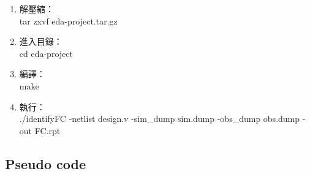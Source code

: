 \documentclass[12pt,a4paper]{article}
\begin{document}
\begin{enumerate}
\item 解壓縮：\\tar zxvf eda-project.tar.gz
\item 進入目錄：\\cd eda-project
\item 編譯：\\make
\item 執行：\\./identifyFC -netlist design.v -sim\_dump sim.dump -obs\_dump obs.dump -out FC.rpt
\end{enumerate}

\subsection{Pseudo code}
\end{document}
